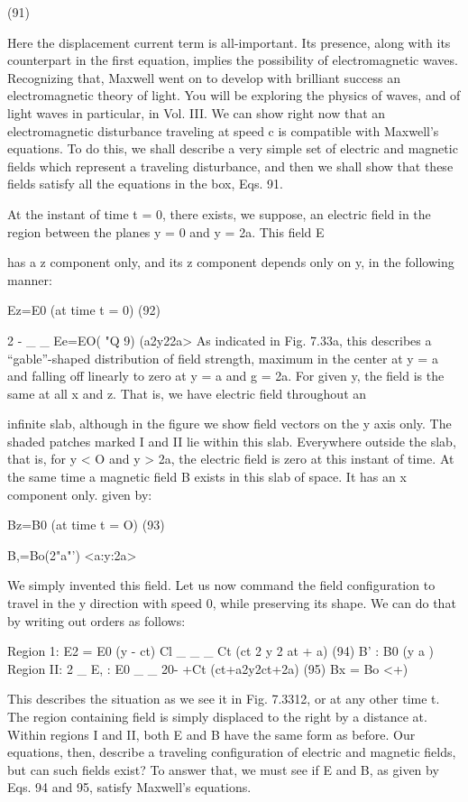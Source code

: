 (91)

 

Here the displacement current term is all-important. Its presence,
along with its counterpart in the first equation, implies the possibility
of electromagnetic waves. Recognizing that, Maxwell went on to
develop with brilliant success an electromagnetic theory of light.
You will be exploring the physics of waves, and of light waves in
particular, in Vol. III. We can show right now that an electromagnetic
disturbance traveling at speed c is compatible with Maxwell's
equations. To do this, we shall describe a very simple set of electric
and magnetic fields which represent a traveling disturbance, and
then we shall show that these fields satisfy all the equations in the
box, Eqs. 91.

At the instant of time t = 0, there exists, we suppose, an electric
field in the region between the planes y = 0 and y = 2a. This field E

has a z component only, and its z component depends only on y, in
the following manner:

Ez=E0%
(at time t = 0) (92)

2 - _ _
Ee=EO( "Q 9) (a2y22a>
As indicated in Fig. 7.33a, this describes a ``gable''-shaped distribution
of field strength, maximum in the center at y = a and falling off
linearly to zero at y = a and g = 2a. For given y, the field is the
same at all x and z. That is, we have electric field throughout an

infinite slab, although in the figure we show field vectors on the y axis
only. The shaded patches marked I and II lie within this slab.
Everywhere outside the slab, that is, for y < O and y > 2a, the electric
field is zero at this instant of time. At the same time a magnetic
field B exists in this slab of space. It has an x component only.
given by:

Bz=B0%
(at time t = O) (93)

B,=Bo(2"a"') <a:y:2a>

We simply invented this field. Let us now command the field
configuration to travel in the y direction with speed 0, while preserving
its shape. We can do that by writing out orders as follows:

Region 1:
E2 = E0 (y - ct)
Cl _ _
_ Ct (ct 2 y 2 at + a) (94)
B' : B0 (y a )
Region II:
2 _
E, : E0  _ _
20- +Ct (ct+a2y2ct+2a) (95)
Bx = Bo <+)

This describes the situation as we see it in Fig. 7.3312, or at any other
time t. The region containing field is simply displaced to the right
by a distance at. Within regions I and II, both E and B have the same
form as before. Our equations, then, describe a traveling configuration
of electric and magnetic fields, but can such fields exist? To
answer that, we must see if E and B, as given by Eqs. 94 and 95, satisfy
Maxwell's equations.

